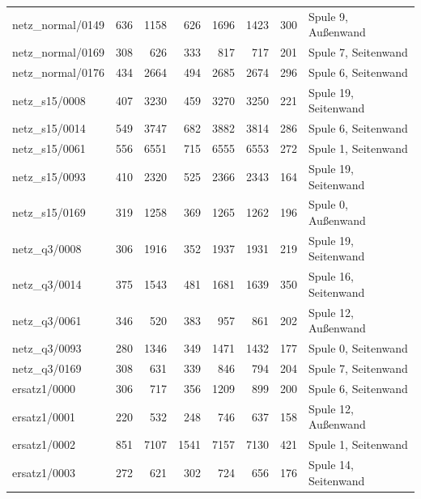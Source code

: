 \begin{tabular}{@{}lrrrrrrl@{}}
netz\_normal/0149 & \num{636} & \num{1158} & \num{626} & \num{1696} & \num{1423} & \num{300} & Spule 9, Außenwand \\
netz\_normal/0169 & \num{308} & \num{626} & \num{333} & \num{817} & \num{717} & \num{201} & Spule 7, Seitenwand \\
netz\_normal/0176 & \num{434} & \num{2664} & \num{494} & \num{2685} & \num{2674} & \num{296} & Spule 6, Seitenwand \\
netz\_s15/0008 & \num{407} & \num{3230} & \num{459} & \num{3270} & \num{3250} & \num{221} & Spule 19, Seitenwand \\
netz\_s15/0014 & \num{549} & \num{3747} & \num{682} & \num{3882} & \num{3814} & \num{286} & Spule 6, Seitenwand \\
netz\_s15/0061 & \num{556} & \num{6551} & \num{715} & \num{6555} & \num{6553} & \num{272} & Spule 1, Seitenwand \\
netz\_s15/0093 & \num{410} & \num{2320} & \num{525} & \num{2366} & \num{2343} & \num{164} & Spule 19, Seitenwand \\
netz\_s15/0169 & \num{319} & \num{1258} & \num{369} & \num{1265} & \num{1262} & \num{196} & Spule 0, Außenwand \\
netz\_q3/0008 & \num{306} & \num{1916} & \num{352} & \num{1937} & \num{1931} & \num{219} & Spule 19, Seitenwand \\
netz\_q3/0014 & \num{375} & \num{1543} & \num{481} & \num{1681} & \num{1639} & \num{350} & Spule 16, Seitenwand \\
netz\_q3/0061 & \num{346} & \num{520} & \num{383} & \num{957} & \num{861} & \num{202} & Spule 12, Außenwand \\
netz\_q3/0093 & \num{280} & \num{1346} & \num{349} & \num{1471} & \num{1432} & \num{177} & Spule 0, Seitenwand \\
netz\_q3/0169 & \num{308} & \num{631} & \num{339} & \num{846} & \num{794} & \num{204} & Spule 7, Seitenwand \\
ersatz1/0000 & \num{306} & \num{717} & \num{356} & \num{1209} & \num{899} & \num{200} & Spule 6, Seitenwand \\
ersatz1/0001 & \num{220} & \num{532} & \num{248} & \num{746} & \num{637} & \num{158} & Spule 12, Außenwand \\
ersatz1/0002 & \num{851} & \num{7107} & \num{1541} & \num{7157} & \num{7130} & \num{421} & Spule 1, Seitenwand \\
ersatz1/0003 & \num{272} & \num{621} & \num{302} & \num{724} & \num{656} & \num{176} & Spule 14, Seitenwand \\

\end{tabular}
